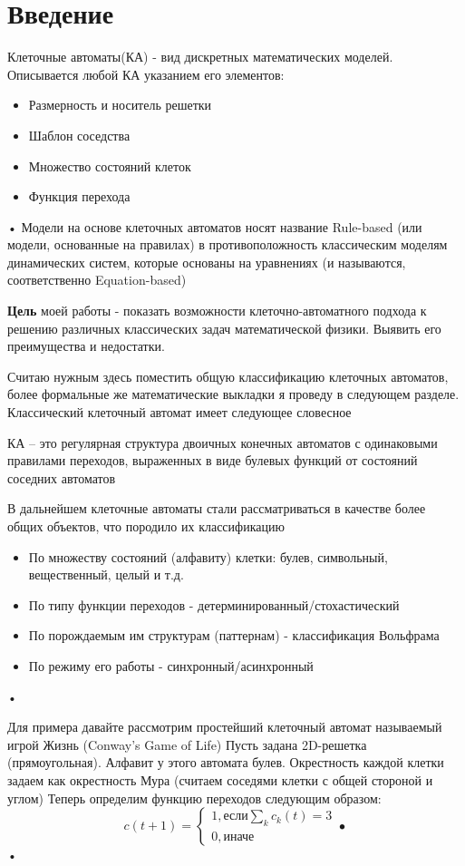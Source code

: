 \section*{Введение}
Клеточные автоматы(КА) - вид дискретных математических моделей. Описывается любой КА указанием его элементов:
\begin{itemize}
\item Размерность и носитель решетки
\item Шаблон соседства
\item Множество состояний клеток
\item Функция перехода
\end{itemize}•
Модели на основе клеточных автоматов носят название Rule-based (или модели, основанные на правилах) в противоположность классическим моделям динамических систем, которые основаны на уравнениях (и называются, соответственно Equation-based)

\textbf{Цель} моей работы - показать возможности клеточно-автоматного подхода к решению различных классических задач математической физики. Выявить его преимущества и недостатки.

Считаю нужным здесь поместить общую классификацию клеточных автоматов, более формальные же математические выкладки я проведу в следующем разделе. Классический клеточный автомат имеет следующее словесное
 \begin{defn}
 КА – это регулярная структура двоичных конечных автоматов с одинаковыми правилами переходов, выраженных в виде булевых функций от состояний соседних автоматов 
 \end{defn}
 В дальнейшем клеточные автоматы стали рассматриваться в качестве более общих объектов, что породило их классификацию
 \begin{itemize}
\item По множеству состояний (алфавиту) клетки: булев, символьный, вещественный, целый и т.д.
\item По типу функции переходов - детерминированный/стохастический
\item По порождаемым им структурам (паттернам) - классификация Вольфрама
\item По режиму его работы - синхронный/асинхронный
\end{itemize}•

Для примера давайте рассмотрим простейший клеточный автомат называемый игрой Жизнь (Conway's Game of Life)
Пусть задана 2D-решетка (прямоугольная). Алфавит у этого автомата булев.
Окрестность каждой клетки задаем как окрестность Мура (считаем соседями клетки с общей стороной и углом)
Теперь определим функцию переходов следующим образом:
\begin{equation*}
c(t+1) = \begin{cases}
1, \text{если} \sum_k {c_k(t)} =3 \\
0, \text{иначе}
\end{cases}•
\end{equation*}•